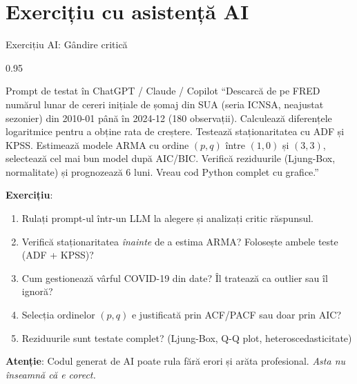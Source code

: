 \documentclass[9pt, aspectratio=169, t]{beamer}
\begin{document}
\section{Exercițiu cu asistență AI}

\begin{frame}{Exercițiu AI: Gândire critică}
    \begin{cminipage}{0.95\textwidth}
    \vspace{-3mm}
    \begin{block}{\footnotesize Prompt de testat în ChatGPT / Claude / Copilot}
        {\footnotesize
        ``Descarcă de pe FRED numărul lunar de cereri inițiale de șomaj din SUA (seria ICNSA, neajustat sezonier) din 2010-01 până în 2024-12 (180 observații). Calculează diferențele logaritmice pentru a obține rata de creștere. Testează staționaritatea cu ADF și KPSS. Estimează modele ARMA cu ordine $(p,q)$ între $(1,0)$ și $(3,3)$, selectează cel mai bun model după AIC/BIC. Verifică reziduurile (Ljung-Box, normalitate) și prognozează 6 luni. Vreau cod Python complet cu grafice.''
        }
    \end{block}
    \vspace{-2mm}
    {\footnotesize
    \textbf{Exercițiu}:
    \begin{enumerate}\setlength{\itemsep}{0pt}
        \item Rulați prompt-ul într-un LLM la alegere și analizați critic răspunsul.
        \item Verifică staționaritatea \textit{înainte} de a estima ARMA? Folosește ambele teste (ADF + KPSS)?
        \item Cum gestionează vârful COVID-19 din date? Îl tratează ca outlier sau îl ignoră?
        \item Selecția ordinelor $(p,q)$ e justificată prin ACF/PACF sau doar prin AIC?
        \item Reziduurile sunt testate complet? (Ljung-Box, Q-Q plot, heteroscedasticitate)
    \end{enumerate}
    }
    \vspace{-2mm}
    \begin{alertblock}{}
        {\footnotesize \textbf{Atenție}: Codul generat de AI poate rula fără erori și arăta profesional. \textit{Asta nu înseamnă că e corect.}}
    \end{alertblock}
    \end{cminipage}
\end{frame}
\end{document}
